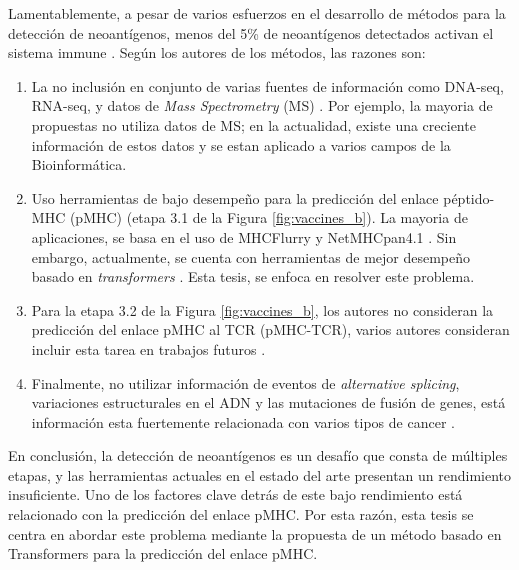 Lamentablemente, a pesar de varios esfuerzos en el desarrollo  de métodos para la detección de neoantígenos, menos del 5\% de neoantígenos detectados activan el sistema immune \citep{de2020neoantigen, mill2022neoms, bulik2019deep, bassani2015mass, yadav2014predicting}. Según los autores de los métodos,  las razones son: 

\begin{enumerate}
	\item La no inclusión en conjunto de varias fuentes de información como DNA-seq, RNA-seq, y datos de \textit{Mass Spectrometry} (MS) \citep{kim2018neopepsee}. Por ejemplo, la mayoria de  propuestas no utiliza datos de MS; en la actualidad, existe una creciente información de estos datos y se estan aplicado a varios campos de la Bioinformática.
	\item  Uso herramientas de bajo desempeño para la predicción del enlace péptido-MHC (pMHC) (etapa 3.1  de la Figura \ref{fig:vaccines_b}). La mayoria de aplicaciones, se basa en el uso de MHCFlurry \citep{o2020mhcflurry} y NetMHCpan4.1 \citep{reynisson2020netmhcpan}. Sin embargo, actualmente, se cuenta con herramientas de mejor desempeño basado en \textit{transformers} \citep{arceda2023neoantigen}. Esta tesis, se enfoca en resolver este problema.
	\item Para la etapa 3.2 de la Figura \ref{fig:vaccines_b}, los autores no consideran  la predicción del enlace pMHC al TCR (pMHC-TCR), varios autores consideran incluir esta tarea en trabajos futuros  \citep{rubinsteyn2018computational}.
	\item Finalmente, no utilizar información de eventos de \textit{alternative splicing}, variaciones estructurales en el ADN y las mutaciones de fusión de genes, está información esta fuertemente relacionada con varios tipos de cancer \citep{wood2020neoepiscope}.
\end{enumerate}

En conclusión, la detección de neoantígenos es un desafío que consta de múltiples etapas, y las herramientas actuales en el estado del arte presentan un rendimiento insuficiente. Uno de los factores clave detrás de este bajo rendimiento está relacionado con la predicción del enlace pMHC. Por esta razón, esta tesis se centra en abordar este problema mediante la propuesta de un método basado en Transformers para la predicción del enlace pMHC.


